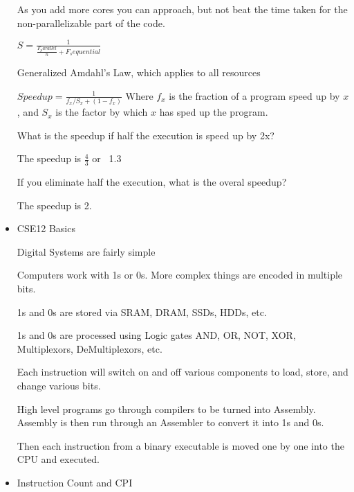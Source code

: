 \documentclass{report}
\begin{document}
\begin{mdframed}
\begin{itemize}
            As you add more cores you can approach, but not
            beat the time taken for the non-parallelizable part
            of the code.

            $S = \frac{1}{\frac{F_parallel}{n} + F_sequential}$

            Generalized Amdahl's Law, which applies to all
            resources

            $Speedup = \frac{1}{f_x / S_x + (1- f_x)}$
            Where $f_x$ is the fraction of a program speed up by
            $x$, and $S_x$ is the factor by which $x$ has sped
            up the program.

            \begin{mdframed}
                What is the speedup if half the execution is
                speed up by 2x?

                The speedup is $\frac{4}{3}$ or ~1.3
            \end{mdframed}

            \begin{mdframed}
                If you eliminate half the execution, what is
                the overal speedup?

                The speedup is 2.
            \end{mdframed}

        \item CSE12 Basics

            Digital Systems are fairly simple

            Computers work with 1s or 0s. More complex
            things are encoded in multiple bits.

            1s and 0s are stored via SRAM, DRAM,
            SSDs, HDDs, etc.

            1s and 0s are processed using Logic gates
            AND, OR, NOT, XOR, Multiplexors, DeMultiplexors, etc.

            Each instruction will switch on and off various
            components to load, store, and change various
            bits.

            High level programs go through compilers to be turned
            into Assembly. Assembly is then run through an Assembler
            to convert it into 1s and 0s.

            Then each instruction from a binary executable is moved
            one by one into the CPU and executed.

        \item Instruction Count and CPI


\end{itemize}
\end{mdframed}
\end{document}
